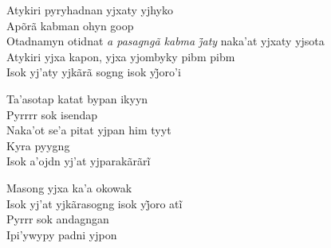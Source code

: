 \begin{linenumbers}\begingroup\raggedright
 
\noindent   Atykiri pyryhadnan yjxaty yjhyko\\
  Apõrã kabman ohyn goop\\
  Otadnamyn otidnat \textit{a pasagngã kabma j̃aty} naka’at yjxaty yjsota\\
  Atykiri yjxa kapon, yjxa yjombyky pibm pibm\\
  Isok yj’aty yjkãrã sogng isok yj̃oro’i
 
\end{linenumbers}\endgroup

\bigskip

\begin{linenumbers}\begingroup\raggedright
 
\noindent   Ta'asotap katat bypan ikyyn\\
  Pyrrrr sok isendap\\
  Naka'ot se'a pitat yjpan him tyyt\\
  Kyra pyygng\\
  Isok a’ojdn yj’at yjparakãrãrĩ
 
\end{linenumbers}\endgroup

\bigskip

\begin{linenumbers}\begingroup\raggedright
 
\noindent   Masong yjxa ka'a okowak\\
  Isok yj’at yjkãrasogng isok yj̃oro atĩ\\
  Pyrrr sok andagngan\\
  Ipi'ywypy padni yjpon
 
\end{linenumbers}\endgroup

